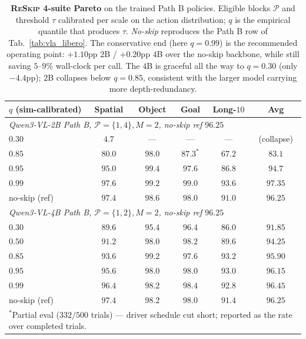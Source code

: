 \documentclass{article}
\newcommand{\reskip}{\textsc{ReSkip}}
\begin{document}
\begin{table}[t]
\caption{\textbf{\reskip{} 4-suite Pareto} on the trained Path B policies. Eligible blocks $\mathcal{P}$ and threshold $\tau$ calibrated per scale on the action distribution; $q$ is the empirical quantile that produces $\tau$. \emph{No-skip} reproduces the Path B row of Tab.~\ref{tab:vla_libero}. The conservative end (here $q{=}0.99$) is the recommended operating point: $+1.10$pp $2$B / $+0.20$pp $4$B over the no-skip backbone, while still saving $5$--$9\%$ wall-clock per call. The $4$B is graceful all the way to $q{=}0.30$ (only $-4.4$pp); $2$B collapses below $q{=}0.85$, consistent with the larger model carrying more depth-redundancy.}
\label{tab:vla_reskip_pareto}
\centering\small
\setlength{\tabcolsep}{4pt}
\begin{tabular}{lccccc}
\toprule
$q$ (sim-calibrated) & Spatial & Object & Goal & Long-$10$ & \textbf{Avg} \\
\midrule
\multicolumn{6}{l}{\emph{Qwen3-VL-2B Path B, $\mathcal{P}{=}\{1,4\}, M{=}2$, no-skip ref $96.25$}} \\
\midrule
$0.30$              & $4.7$  & ---     & ---     & ---     & (collapse) \\
$0.85$              & $80.0$ & $98.0$  & $87.3^\ast$ & $67.2$  & $83.1$ \\
$0.95$              & $95.0$ & $99.4$  & $97.6$  & $86.8$  & $94.7$ \\
$\mathbf{0.99}$     & $\mathbf{97.6}$ & $\mathbf{99.2}$  & $\mathbf{99.0}$  & $\mathbf{93.6}$  & $\mathbf{97.35}$ \\
no-skip (ref)       & $97.4$ & $98.6$  & $98.0$  & $91.0$  & $96.25$ \\
\midrule
\multicolumn{6}{l}{\emph{Qwen3-VL-4B Path B, $\mathcal{P}{=}\{1,2\}, M{=}2$, no-skip ref $96.25$}} \\
\midrule
$0.30$              & $89.6$ & $95.4$  & $96.4$  & $86.0$  & $91.85$ \\
$0.50$              & $91.2$ & $98.0$  & $98.2$  & $89.6$  & $94.25$ \\
$0.85$              & $93.6$ & $99.2$  & $97.6$  & $93.2$  & $95.90$ \\
$0.95$              & $95.6$ & $98.0$  & $98.0$  & $93.0$  & $96.15$ \\
$\mathbf{0.99}$     & $\mathbf{96.4}$ & $\mathbf{98.2}$  & $\mathbf{98.4}$  & $\mathbf{92.8}$  & $\mathbf{96.45}$ \\
no-skip (ref)       & $97.4$ & $98.2$  & $98.0$  & $91.4$  & $96.25$ \\
\bottomrule
\multicolumn{6}{p{14cm}}{\footnotesize $^\ast$Partial eval ($332/500$ trials) — driver schedule cut short; reported as the rate over completed trials.}
\end{tabular}
\end{table}
\end{document}
